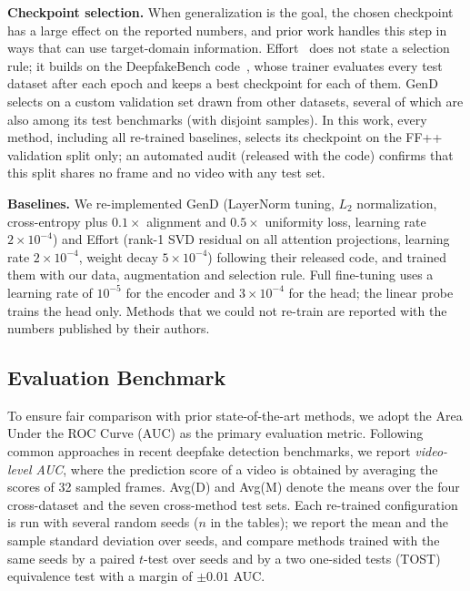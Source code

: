 \documentclass[fonts]{icst}
\newif\ifrevmark\revmarktrue
\newcommand{\rev}[1]{\ifrevmark{\color{revblue}#1}\else#1\fi}
\newenvironment{revblock}{\ifrevmark\color{revblue}\fi}{}
\begin{document}
\begin{revblock}
\noindent\textbf{Checkpoint selection.}\label{sec:selection}
When generalization is the goal, the chosen checkpoint has a large effect on the reported numbers, and prior work handles this step in ways that can use target-domain information. Effort~\cite{yan2025effort} does not state a selection rule; it builds on the DeepfakeBench code~\cite{yan2023deepfakebench}, whose trainer evaluates every test dataset after each epoch and keeps a best checkpoint for each of them. GenD~\cite{yermakov2025gend} selects on a custom validation set drawn from other datasets, several of which are also among its test benchmarks (with disjoint samples). In this work, every method, including all re-trained baselines, selects its checkpoint on the FF++ validation split only; an automated audit (released with the code) confirms that this split shares no frame and no video with any test set.

\noindent\textbf{Baselines.}
We re-implemented GenD (LayerNorm tuning, $L_2$ normalization, cross-entropy plus $0.1\times$ alignment and $0.5\times$ uniformity loss, learning rate $2\times10^{-4}$) and Effort (rank-1 SVD residual on all attention projections, learning rate $2\times10^{-4}$, weight decay $5\times10^{-4}$) following their released code, and trained them with our data, augmentation and selection rule. Full fine-tuning uses a learning rate of $10^{-5}$ for the encoder and $3\times10^{-4}$ for the head; the linear probe trains the head only. Methods that we could not re-train are reported with the numbers published by their authors.
\end{revblock}

\subsection{Evaluation Benchmark}

To ensure fair comparison with prior state-of-the-art methods, we adopt the Area Under the ROC Curve (AUC) as the primary evaluation metric.
Following common \rev{approaches} in recent deepfake detection benchmarks, we report \textit{video-level AUC}, where the prediction score of a video is obtained by averaging the scores of 32 sampled frames.
\rev{Avg(D) and Avg(M) denote the means over the four cross-dataset and the seven cross-method test sets. Each re-trained configuration is run with several random seeds ($n$ in the tables); we report the mean and the sample standard deviation over seeds, and compare methods trained with the same seeds by a paired $t$-test over seeds and by a two one-sided tests (TOST) equivalence test with a margin of $\pm0.01$ AUC.}
\end{document}
